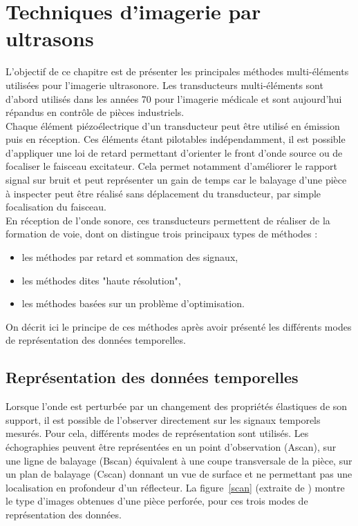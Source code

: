 \chapter{Techniques d'imagerie par ultrasons}


 L'objectif de ce chapitre est de présenter les principales méthodes multi-éléments utilisées pour l'imagerie ultrasonore. Les transducteurs multi-éléments sont d'abord utilisés dans les années 70 pour l'imagerie médicale et sont aujourd'hui répandus en contrôle de pièces industriels.\\

Chaque élément piézoélectrique d'un transducteur peut être utilisé en émission puis en réception. Ces éléments étant pilotables indépendamment, il est possible d'appliquer une loi de retard permettant d'orienter le front d'onde source ou de focaliser le faisceau excitateur. Cela permet notamment d'améliorer le rapport signal sur bruit et peut représenter un gain de temps car le balayage d'une pièce à inspecter peut être réalisé sans déplacement du transducteur, par simple focalisation du faisceau.\\

En réception de l'onde sonore, ces transducteurs permettent de réaliser de la formation de voie, dont on distingue trois principaux types de méthodes : 
\begin{itemize}
	\item les méthodes par retard et sommation des signaux,
	\item les méthodes dites "haute résolution",
	\item les méthodes basées sur un problème d'optimisation.
\end{itemize} 

On décrit ici le principe de ces méthodes après avoir présenté les différents modes de représentation des données temporelles.




\section{Représentation des données temporelles}

Lorsque l'onde est perturbée par un changement des propriétés élastiques de son support, il est possible de l'observer directement sur les signaux temporels mesurés. Pour cela, différents modes de représentation sont utilisés. Les échographies peuvent être représentées en un point d'observation (Ascan), sur une ligne de balayage (Bscan) équivalent à une coupe transversale de la pièce,  sur un plan de balayage (Cscan) donnant un vue de surface et ne permettant pas une localisation en profondeur d'un réflecteur. La figure~\ref{scan} (extraite de \cite{bannouf}) montre le type d'images obtenues d'une pièce perforée, pour ces trois modes de représentation des données. \\
 
